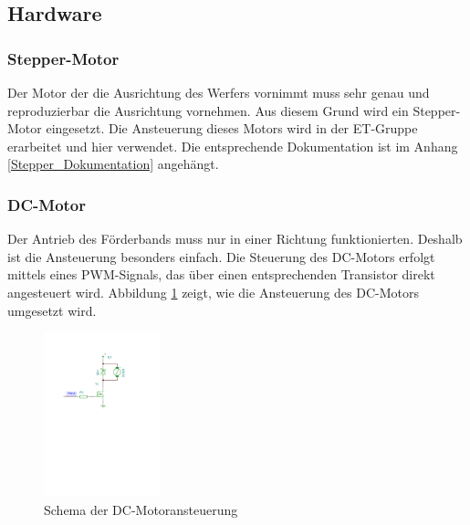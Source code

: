 \subsection{Hardware}
    
    \newpage
    
    
    
    \newpage
\subsubsection{Stepper-Motor}
    Der Motor der die Ausrichtung des Werfers vornimmt muss sehr genau und 
    reproduzierbar die Ausrichtung vornehmen. Aus diesem Grund wird ein 
    Stepper-Motor eingesetzt. Die Ansteuerung dieses Motors wird in der 
    ET-Gruppe erarbeitet und hier verwendet. Die entsprechende Dokumentation 
    ist im Anhang \ref{Stepper_Dokumentation} angehängt.
\subsubsection{DC-Motor}
    Der Antrieb des Förderbands muss nur in einer Richtung funktionierten. 
    Deshalb ist die Ansteuerung besonders einfach. Die Steuerung des DC-Motors 
    erfolgt mittels eines PWM-Signals, das über einen entsprechenden 
    Transistor direkt angesteuert wird. Abbildung \ref{fig:Schema_DC-Motor} 
    zeigt, wie die Ansteuerung des DC-Motors umgesetzt wird.
    \begin{figure}[h!] %
    	\centering
    	\includegraphics[width=0.3\textwidth,clip,trim=37mm 159mm 62mm 37mm]
    	{Enddokumentation/Loesungskonzept/Bilder/SchemaDcMotor.pdf}
    	\caption{Schema der DC-Motoransteuerung}
    	\label{fig:Schema_DC-Motor}
    \end{figure}